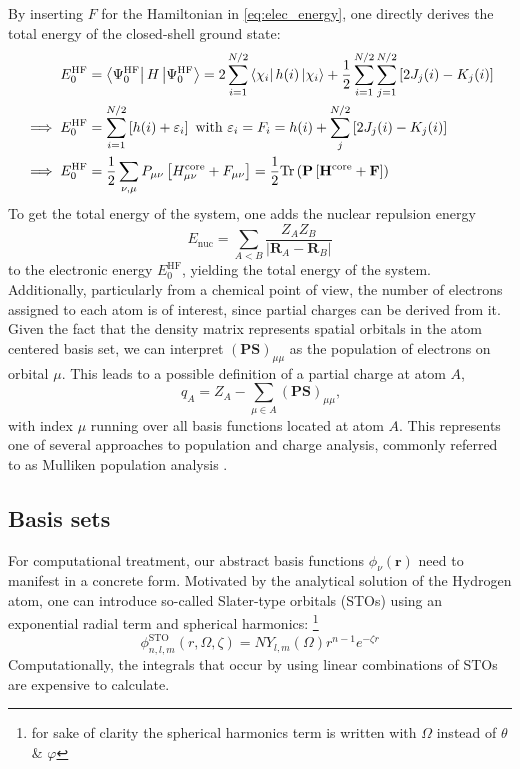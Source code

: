 By inserting $F$ for the Hamiltonian in \autoref{eq:elec_energy}, one directly derives the total energy of the closed-shell ground state: 
\begin{subequations}
\begin{align}
    E^\text{HF}_0 &= \bra{\Psi^\text{HF}_0} H \ket{\Psi^\text{HF}_0} = 2\sum_{i=1}^{N/2} \bra{\chi_i} h(i) \ket{\chi_i}
    + \frac{1}{2}\sum_{i=1}^{N/2}\sum_{j=1}^{N/2} \left[ 2 J_j(i) - K_j(i) \right]\\
    \implies E^\text{HF}_0 &= \sum_{i=1}^{N/2}\left[ h(i) + \varepsilon_i\right] \text{  with  } \varepsilon_i = F_i =  h(i) + \sum_{j}^{N/2} \left[ 2 J_j(i) - K_j(i) \right]\\
    \implies E^\text{HF}_0 &= \frac{1}{2} \sum_{\nu, \mu} P_{\mu \nu} \left[ H_{\mu \nu}^\text{core} + F_{\mu \nu} \right] = \frac{1}{2} \text{Tr} \left( \mathbf{P} \left[ \mathbf{H}^\text{core} + \mathbf{F} \right] \right)
\end{align}
\end{subequations}
To get the total energy of the system, one adds the nuclear repulsion energy 
\begin{equation}
E_\text{nuc} = \sum_{A<B} \frac{Z_A Z_B}{|\mathbf{R}_A - \mathbf{R}_B|}
\end{equation}
to the electronic energy $E^\text{HF}_0$, yielding the total energy of the system. Additionally, particularly from a chemical point of view, the number of electrons assigned to each atom is of interest, since partial charges can be derived from it. Given the fact that the density matrix represents spatial orbitals in the atom centered basis set, we can interpret $\mathbf{(PS)}_{\mu \mu}$ as the population of electrons on orbital $\mu$. This leads to a possible definition of a partial charge at atom $A$,
\begin{equation}
    \
    q_A = Z_A - \sum_{\mu \in A} \mathbf{(PS)}_{\mu \mu},
\end{equation}
with index $\mu$ running over all basis functions located at atom $A$. This represents one of several approaches to population and charge analysis, commonly referred to as Mulliken population analysis \parencite{ref:mulliken1955electronic}. 
\subsection{Basis sets}
\label{subsec:background_hf_basis_sets}
For computational treatment, our abstract basis functions $\phi_\nu(\mathbf{r})$ need to manifest in a concrete form. 
Motivated by the analytical solution of the Hydrogen atom, one can introduce so-called Slater-type orbitals (STOs) using an exponential radial term and spherical harmonics: \footnote{for sake of clarity the spherical harmonics term is written with $\Omega$ instead of $\theta$ \& $\varphi$}
\begin{equation}
    \label{eq:slater_orbital}
    \phi_{n, l, m}^{\text{STO}}(r, \Omega, \zeta) = N Y_{l,m}(\Omega) r^{n-1} e^{-\zeta r}
\end{equation} 
Computationally, the integrals that occur by using linear combinations of STOs are expensive to calculate. \\

